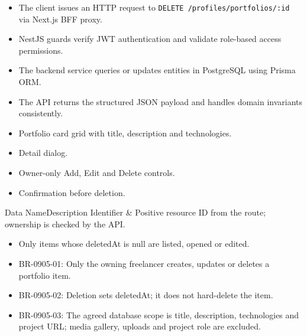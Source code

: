 \begin{itemize}[leftmargin=1.6em,topsep=3pt,itemsep=2pt,parsep=0pt,label=$\bullet$]
    \item The client issues an HTTP request to \texttt{DELETE /\allowbreak{}profiles/\allowbreak{}portfolios/\allowbreak{}:\allowbreak{}id} via Next.js BFF proxy.
    \item NestJS guards verify JWT authentication and validate role-based access permissions.
    \item The backend service queries or updates entities in PostgreSQL using Prisma ORM.
    \item The API returns the structured JSON payload and handles domain invariants consistently.
\end{itemize}

\begin{itemize}[leftmargin=1.6em,topsep=3pt,itemsep=2pt,parsep=0pt,label=$\bullet$]
    \item Portfolio card grid with title, description and technologies.
    \item Detail dialog.
    \item Owner-only Add, Edit and Delete controls.
    \item Confirmation before deletion.
\end{itemize}


\begin{specdatatable}{Data Name}{Description}
Identifier & Positive resource ID from the route; ownership is checked by the API.\\ \hline
\end{specdatatable}

\begin{itemize}[leftmargin=1.6em,topsep=3pt,itemsep=2pt,parsep=0pt,label=$\bullet$]
    \item Only items whose deletedAt is null are listed, opened or edited.
\end{itemize}

\begin{itemize}[leftmargin=1.6em,topsep=3pt,itemsep=2pt,parsep=0pt,label=$\bullet$]\brrulelist
    \item BR-0905-01: Only the owning freelancer creates, updates or deletes a portfolio item.
    \item BR-0905-02: Deletion sets deletedAt; it does not hard-delete the item.
    \item BR-0905-03: The agreed database scope is title, description, technologies and project URL; media gallery, uploads and project role are excluded.
\end{itemize}

